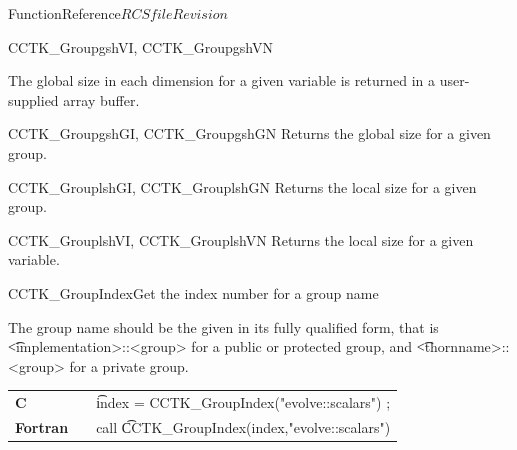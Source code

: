 \begin{cactuspart}{FunctionReference}{$RCSfile$}{$Revision$}
\begin{FunctionDescription}{CCTK\_GroupgshVI, CCTK\_GroupgshVN}
\begin{Discussion}
The global size in each dimension for a given variable is returned in a user-supplied array buffer.
\end{Discussion}

\begin{SeeAlsoSection}
\begin{SeeAlso}{CCTK\_GroupgshGI, CCTK\_GroupgshGN}
Returns the global size for a given group.
\end{SeeAlso}
\begin{SeeAlso}{CCTK\_GrouplshGI, CCTK\_GrouplshGN}
Returns the local size for a given group.
\end{SeeAlso}
\begin{SeeAlso}{CCTK\_GrouplshVI, CCTK\_GrouplshVN}
Returns the local size for a given variable.
\end{SeeAlso}
\end{SeeAlsoSection}

\end{FunctionDescription}


\begin{CCTKFunc}{CCTK\_GroupIndex}{Get the index number for a group name}
\label{CCTK-GroupIndex}
\showargs
\begin{params}
\end{params}
\begin{discussion}
The group name should be the given in its fully qualified form, that is {\t <implementation>::<group>} for a public or protected group, and {\t <thornname>::<group>} for a private group.
\end{discussion}
\begin{examples}
\begin{tabular}{@{}p{3cm}cp{11cm}}
\hfill {\bf C} && {\t index = CCTK\_GroupIndex("evolve::scalars") };
\\
\hfill {\bf Fortran} && call {\t CCTK\_GroupIndex(index,"evolve::scalars")}
\\
\end{tabular}
\end{examples}
\begin{errorcodes}
\end{errorcodes}
\end{CCTKFunc}




\end{cactuspart}
